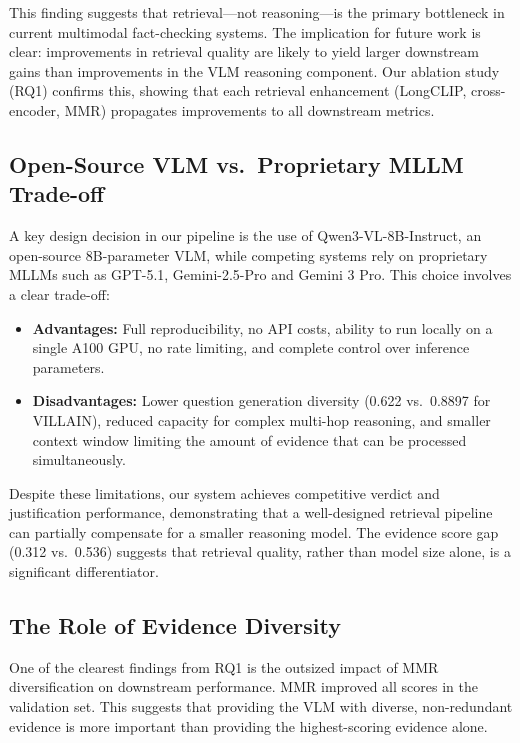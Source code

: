 This finding suggests that retrieval—not reasoning—is the primary bottleneck in current multimodal fact-checking systems. The implication for future work is clear: improvements in retrieval quality are likely to yield larger downstream gains than improvements in the VLM reasoning component. Our ablation study (RQ1) confirms this, showing that each retrieval enhancement (LongCLIP, cross-encoder, MMR) propagates improvements to all downstream metrics.

\subsection{Open-Source VLM vs.\ Proprietary MLLM Trade-off}

A key design decision in our pipeline is the use of Qwen3-VL-8B-Instruct, an open-source 8B-parameter VLM, while competing systems rely on proprietary MLLMs such as GPT-5.1, Gemini-2.5-Pro and Gemini 3 Pro. This choice involves a clear trade-off:

\begin{itemize}
    \item \textbf{Advantages:} Full reproducibility, no API costs, ability to run locally on a single A100 GPU, no rate limiting, and complete control over inference parameters.
    \item \textbf{Disadvantages:} Lower question generation diversity (0.622 vs.\ 0.8897 for VILLAIN), reduced capacity for complex multi-hop reasoning, and smaller context window limiting the amount of evidence that can be processed simultaneously.
\end{itemize}

Despite these limitations, our system achieves competitive verdict and justification performance, demonstrating that a well-designed retrieval pipeline can partially compensate for a smaller reasoning model. The evidence score gap (0.312 vs.\ 0.536) suggests that retrieval quality, rather than model size alone, is a significant differentiator.

\subsection{The Role of Evidence Diversity}

One of the clearest findings from RQ1 is the outsized impact of MMR diversification on downstream performance. MMR improved all scores in the validation set. This suggests that providing the VLM with diverse, non-redundant evidence is more important than providing the highest-scoring evidence alone.


